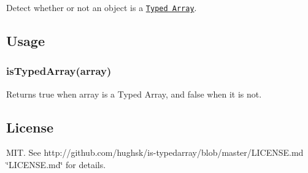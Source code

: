 Detect whether or not an object is a \href{https://developer.mozilla.org/en-US/docs/Web/JavaScript/Typed_arrays}{\tt Typed Array}.

\subsection*{Usage}

\href{https://nodei.co/npm/is-typedarray/}{\tt }

\subsubsection*{is\+Typed\+Array(array)}

Returns {\ttfamily true} when array is a Typed Array, and {\ttfamily false} when it is not.

\subsection*{License}

M\+IT. See http\+://github.com/hughsk/is-\/typedarray/blob/master/\+L\+I\+C\+E\+N\+S\+E.\+md \char`\"{}\+L\+I\+C\+E\+N\+S\+E.\+md\char`\"{} for details. 